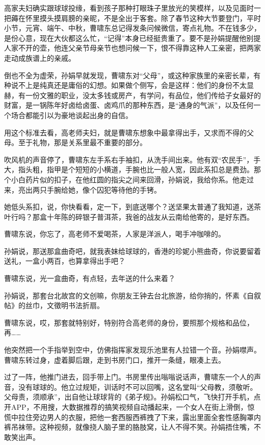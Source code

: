 \documentclass[lang=cn,newtx,12pt,scheme=chinese]{elegantbook}
\begin{document}
高家夫妇确实跟球球投缘，看到孩子那种打眼珠子里放光的笑模样，以及见面时一把薅在怀里摸头摸肩膀的亲昵，不是全出于客套。除了春节这种大节要登门，平时小节，元宵、端午、中秋，曹啸东总记得发条问候微信，寄点礼物。不在钱多少，是份心意，现在大伙都这么忙，“记得”本身已经挺贵重了。要不是孙娟提醒他别提人家不开的壶，他连父亲节母亲节也想问候一下，恨不得靠这种人工亲密，把两家走动成族谱上的亲戚。

倒也不全为虚荣，孙娟早就发现，曹啸东对“父母”，或这种家族里的亲密长辈，有种说不上是纯真还是庸俗的幻想。如果做个侧写，会是这样：他们的身份不太显赫，有一份文雅的职业，没太多钱或房产，有学问，有品位，他们传给子女最好的财富，是一锅陈年好卤给卤蛋、卤鸡爪的那种东西，是“通身的气派”，以及任何一个场合都能引以为豪地谈起出身的自信。

用这个标准去看，高老师夫妇，就是曹啸东想象中最拿得出手，又求而不得的父母。至于礼物，那是关系里最不重要的部分。

吹风机的声音停了，曹啸东左手系右手袖扣，从洗手间出来。他有双“农民手”，手大，指头粗，指甲是个短短的小横道，手腕也比一般人宽，因此系扣总是费劲。那个小白药片似的扣子，在他红圆的指尖之间来回滑，孙娟说，我给你系。他走过来，亮出两只手腕给她，像个囚犯等待他的手铐。

她低头系扣，说，你快看看，定一下，到底送哪个？送坚果太普通了我知道，送茶叶行吗？那盒十年陈的碎银子普洱茶，我爸的战友从云南给他寄的，是好东西。

曹啸东说，你忘了，高老师不爱喝茶，人家是洋派人，喝手冲咖啡的。

孙娟说，那送那盒曲奇吧，就我表妹给球球的，香港的珍妮小熊曲奇，你说要留着送礼，一盒小两百，也算拿得出手吧？

曹啸东说，光一盒曲奇，有点轻，去年送的什么来着？

孙娟说，那套台北故宫的文创嘛，你朋友王钟去台北旅游，给你捎的，怀素《自叙帖》的丝巾，文徵明书法折扇。

曹啸东说，哎，那套就特别好，特别符合高老师的身份，要照那个规格和品位，再……

他突然把一个手指举到空中，仿佛指挥家发现乐池里有人拉错一个音。孙娟噤声。曹啸东转过身，虚着脚后跟，走到书房门口，推开一条缝，眼凑上去。

过了一阵，他推门进去，回手带上门。书房里传出嗡嗡说话声，曹啸东一个人的声音，没有球球的。他立过规矩，训话时不可以回嘴，这名堂叫“父母教，须敬听。父母责，须顺承”，出自他让球球背的《弟子规》。孙娟松口气，飞快打开手机，点开APP，不用搜，大数据推荐的搞笑视频自动播起来，一个女人在街上滑倒，惊慌中拉住旁边男人的衣服，把他一套西服西裤拽了下来，露出里面全套性感胸罩内裤吊袜带。这种视频，就像挠人脑子里的胳肢窝，让人不得不笑。孙娟捂住嘴，不敢笑出声。
\end{document}
